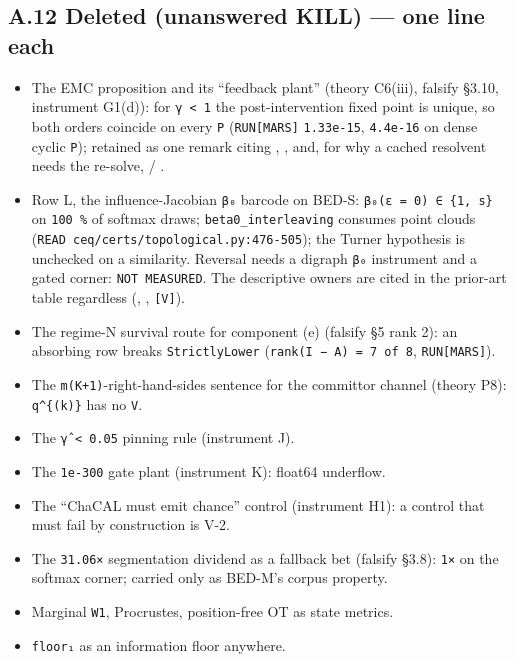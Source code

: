 \documentclass[11pt,a4paper]{article}
\theoremstyle{plain}
\theoremstyle{definition}
\theoremstyle{remark}
\providecommand{\tightlist}{%
  \setlength{\itemsep}{0pt}\setlength{\parskip}{0pt}}
\begin{document}
\subsection{A.12 Deleted (unanswered KILL) --- one line
each}\label{a.12-deleted-unanswered-kill-one-line-each}

\begin{itemize}
\tightlist
\item
  The EMC proposition and its ``feedback plant'' (theory C6(iii),
  falsify §3.10, instrument G1(d)): for \texttt{γ\ \textless{}\ 1} the
  post-intervention fixed point is unique, so both orders coincide on
  every \texttt{P} (\texttt{RUN{[}MARS{]}} \texttt{1.33e-15},
  \texttt{4.4e-16} on dense cyclic \texttt{P}); retained as one remark
  citing \citep{dash-2005-emc}, \citep{mooij-2013-ode2scm},
  \citep{voortman-2010-manipulation} and, for why a cached resolvent
  needs the re-solve, \citep{momennejad-2017-sr} /
  \citep{russek-2017-predictive}.
\item
  Row L, the influence-Jacobian \texttt{β₀} barcode on BED-S:
  \texttt{β₀(ε\ =\ 0)\ ∈\ \{1,\ s\}} on \texttt{100\ \%} of softmax
  draws; \texttt{beta0\_interleaving} consumes point clouds
  (\texttt{READ\ ceq/certs/topological.py:476-505}); the Turner
  hypothesis is unchecked on a similarity. Reversal needs a digraph
  \texttt{β₀} instrument and a gated corner: \texttt{NOT\ MEASURED}. The
  descriptive owners are cited in the prior-art table regardless
  (\citep{kushnareva-2021-tda-attention}, \citep{kushnareva-2022-betti},
  \citep{kim-2026-topological-causal} \texttt{{[}V{]}}).
\item
  The regime-N survival route for component (e) (falsify §5 rank 2): an
  absorbing row breaks \texttt{StrictlyLower}
  (\texttt{rank(I\ −\ A\textquotesingle{})\ =\ 7\ of\ 8},
  \texttt{RUN{[}MARS{]}}).
\item
  The \texttt{m(K+1)}-right-hand-sides sentence for the committor
  channel (theory P8): \texttt{q\^{}\{(k)\}} has no \texttt{V}.
\item
  The \texttt{\textbar{}γ̂\textbar{}\ \textless{}\ 0.05} pinning rule
  (instrument J).
\item
  The \texttt{1e-300} gate plant (instrument K): float64 underflow.
\item
  The ``ChaCAL must emit chance'' control (instrument H1): a control
  that must fail by construction is V-2.
\item
  The \texttt{31.06×} segmentation dividend as a fallback bet (falsify
  §3.8): \texttt{1×} on the softmax corner; carried only as BED-M's
  corpus property.
\item
  Marginal \texttt{W1}, Procrustes, position-free OT as state metrics.
\item
  \texttt{floor₁} as an information floor anywhere.
\end{itemize}
\end{document}
